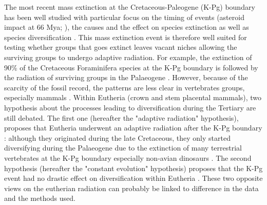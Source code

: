 \documentclass[12pt,letterpaper]{article}
\begin{document}




The most recent mass extinction at the Cretaceous-Paleogene (K-Pg) boundary has been well studied with particular focus on the timing of events (asteroid impact at 66 Mya; \citealt{rennetime2013}), the causes \citep[e.g.][]{rennetime2013,BRV:BRV12128} and the effect on species extinction \citep[e.g.][]{Erwin1998344,BRV:BRV12128} as well as species diversification \citep[e.g.][]{Stadler12042011,meredithimpacts2011,O'Leary08022013}. This mass extinction event is therefore well suited for testing whether groups that goes extinct leaves vacant niches allowing the surviving groups to undergo adaptive radiation. For example, the extinction of 90\% of the Cretaceous Foraminifera species at the K-Pg boundary is followed by the radiation of surviving groups in the Palaeogene \citep{D'Hondt01011996,Coxall01042006}. However, because of the scarcity of the fossil record, the patterns are less clear in vertebrates groups, especially mammals \citep[e.g.][]{meredithimpacts2011,O'Leary08022013}. Within Eutheria (crown and stem placental mammals), two hypothesis about the processes leading to diversification during the Tertiary are still debated. The first one (hereafter the "adaptive radiation" hypothesis), proposes that Eutheria underwent an adaptive radiation after the K-Pg boundary \citep{goswamia2011,MEE3:MEE312084,O'Leary08022013}: although they originated during the late Cretaceous, they only started diversifying during the Palaeogene due to the extinction of many terrestrial vertebrates at the K-Pg boundary especially non-avian dinosaurs \citep{BRV:BRV12128}. The second hypothesis (hereafter the "constant evolution" hypothesis) proposes that the K-Pg event had no drastic effect on diversification within Eutheria \citep{meredithimpacts2011,Stadler12042011,beckancient2014}. These two opposite views on the eutherian radiation can probably be linked to difference in the data and the methods used.
\end{document}
